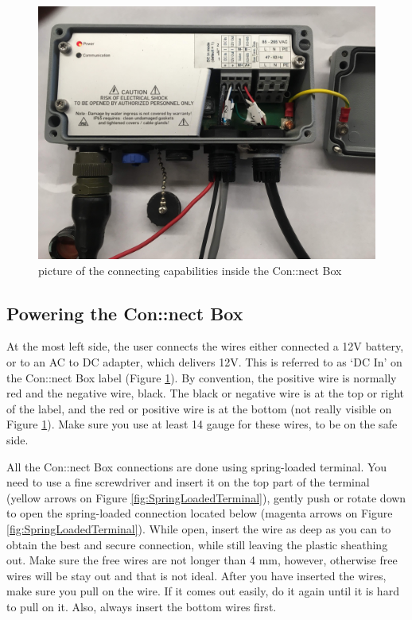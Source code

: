\documentclass[]{book}
\begin{document}
\begin{figure}

{\centering \includegraphics[width=0.7\linewidth]{pictures/ConnectBoxFull} 

}

\caption{picture of the connecting capabilities inside the Con::nect Box}\label{fig:connectboxfull}
\end{figure}

\hypertarget{powering-the-connect-box}{%
\subsection{Powering the Con::nect Box}\label{powering-the-connect-box}}

At the most left side, the user connects the wires either connected a 12V battery, or to an AC to DC adapter, which delivers 12V. This is referred to as `DC In' on the Con::nect Box label (Figure \ref{fig:connectboxfull}). By convention, the positive wire is normally red and the negative wire, black. The black or negative wire is at the top or right of the label, and the red or positive wire is at the bottom (not really visible on Figure \ref{fig:connectboxfull}). Make sure you use at least 14 gauge for these wires, to be on the safe side.

All the Con::nect Box connections are done using spring-loaded terminal. You need to use a fine screwdriver and insert it on the top part of the terminal (yellow arrows on Figure \ref{fig:SpringLoadedTerminal}), gently push or rotate down to open the spring-loaded connection located below (magenta arrows on Figure \ref{fig:SpringLoadedTerminal}). While open, insert the wire as deep as you can to obtain the best and secure connection, while still leaving the plastic sheathing out. Make sure the free wires are not longer than 4 mm, however, otherwise free wires will be stay out and that is not ideal. After you have inserted the wires, make sure you pull on the wire. If it comes out easily, do it again until it is hard to pull on it. Also, always insert the bottom wires first.
\end{document}
